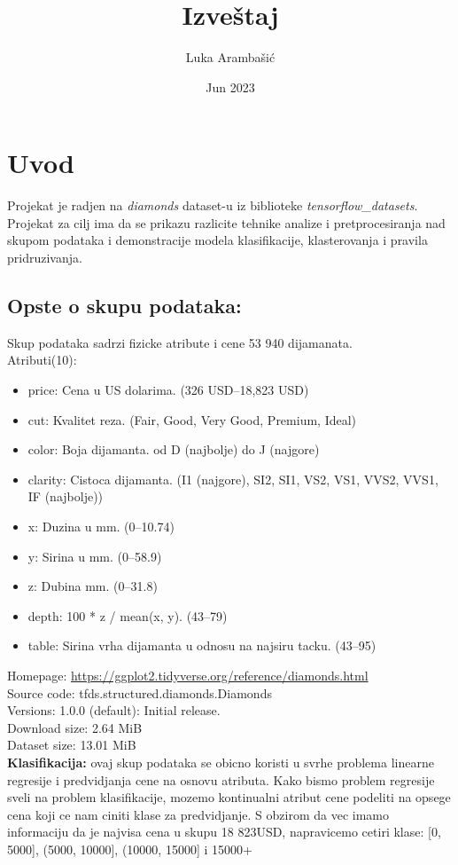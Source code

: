 \documentclass[10pt]{article}
\title {Izveštaj}
\author{Luka Arambašić}
\date{Jun 2023}
\begin{document}
\maketitle
\tableofcontents
\newpage
\section{Uvod}
Projekat je radjen na \textit{diamonds} dataset-u iz biblioteke \textit{tensorflow\_datasets}.\\


Projekat za cilj ima da se prikazu razlicite tehnike analize i pretprocesiranja nad skupom podataka i demonstracije modela klasifikacije, klasterovanja i pravila pridruzivanja.

\subsection*{Opste o skupu podataka:}
Skup podataka sadrzi fizicke atribute i cene 53 940 dijamanata.\\
Atributi(10):
\begin{itemize}
\item price: Cena u US dolarima. (326 USD--18,823 USD)
\item cut: Kvalitet reza. (Fair, Good, Very Good, Premium, Ideal)
\item color: Boja dijamanta. od D (najbolje) do J (najgore)
\item clarity: Cistoca dijamanta. (I1 (najgore), SI2, SI1, VS2, VS1, VVS2, VVS1, IF (najbolje))
\item x: Duzina u mm. (0--10.74)
\item y: Sirina u mm. (0--58.9)
\item z: Dubina mm. (0--31.8)
\item depth: 100 * z / mean(x, y). (43--79)
\item table: Sirina vrha dijamanta u odnosu na najsiru tacku. (43--95)
\end{itemize}
Homepage: \href{https://ggplot2.tidyverse.org/reference/diamonds.html}{https://ggplot2.tidyverse.org/reference/diamonds.html}\\
Source code: tfds.structured.diamonds.Diamonds\\
Versions: 1.0.0 (default): Initial release.\\
Download size: 2.64 MiB\\
Dataset size: 13.01 MiB\\
\newpage
\textbf{Klasifikacija:} ovaj skup podataka se obicno koristi u svrhe problema linearne regresije i predvidjanja cene na osnovu atributa. Kako bismo problem regresije sveli na problem klasifikacije, mozemo kontinualni atribut cene podeliti na opsege cena koji ce nam ciniti klase za predvidjanje. S obzirom da vec imamo informaciju da je najvisa cena u skupu 18 823USD, napravicemo cetiri klase: [0, 5000], (5000, 10000], (10000, 15000] i 15000+\\\\
\end{document}
